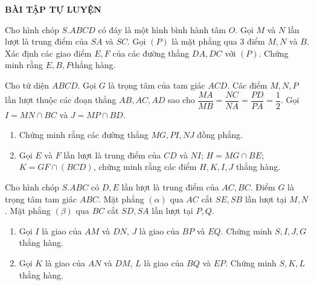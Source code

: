 			\begin{center}
				\textbf{BÀI TẬP TỰ LUYỆN}
			\end{center}
			\begin{bt}%
				Cho hình chóp $S.ABCD $ có đáy là một hình bình hành tâm $O$. Gọi $M$ và $N$ lần lượt là trung điểm của $SA$ và $SC$. Gọi $(P)$ là mặt phẳng qua 3 điểm $M, N$ và $B$.
				Xác định các giao điểm $E, F$ của các đường thẳng $DA, DC$ với $(P)$. Chứng minh rằng $E, B, F$thẳng hàng.
			\end{bt}
			
			\begin{bt}%
				Cho tứ diện $ABCD$. Gọi $G$ là trọng tâm của tam giác $ACD$. Các điểm $M, N, P$ lần lượt thuộc các đoạn thẳng $AB, AC, AD$ sao cho $\dfrac{MA}{MB}=\dfrac{NC}{NA}=\dfrac{PD}{PA}=\dfrac{1}{2}$. Gọi $I=MN \cap BC$ và $J=MP \cap BD$.
				\begin{enumerate}
					\item Chứng minh rằng các đường thẳng $MG, PI, NJ$ đồng phẳng.
					\item Gọi $E$ và $F$ lần lượt là trung điểm của $CD$ và $NI$; $H=MG \cap BE$; $K=GF \cap (BCD)$, chứng minh rằng các điểm $H, K, I, J$ thẳng hàng.
				\end{enumerate}
			\end{bt}
			
			\begin{bt}%
				Cho hình chóp $S.ABC$ có $D, E$ lần lượt là trung điểm của $AC, BC$. Điểm $G$ là trọng tâm tam giác $ABC$. Mặt phẳng $(\alpha)$ qua $AC$ cắt $SE, SB$ lần lượt tại $M, N$. Mặt phẳng $(\beta)$ qua $BC$ cắt $SD, SA$ lần lượt tại $P, Q$.
				\begin{enumerate}
					\item Gọi $I$ là giao của $AM$ và $DN$, $J$ là giao của $BP$ và $EQ$. Chứng minh $S, I, J, G$ thẳng hàng.
					
					\item Gọi $K$ là giao của $AN$ và $DM$, $L$ là giao của $BQ$ và $EP$. Chứng minh $S, K, L$ thẳng hàng.
				\end{enumerate}
			\end{bt}
			
